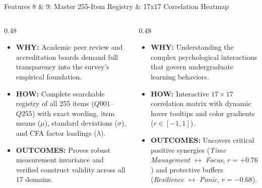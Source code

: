 \documentclass[aspectratio=169,10pt]{beamer}
\begin{document}
\begin{frame}{Features 8 \& 9: Master 255-Item Registry \& 17x17 Correlation Heatmap}
\begin{columns}[T]
\begin{column}{0.48\textwidth}
\begin{tcolorbox}[colframe=subhead,colbacktitle=subhead,colback=neutralbg,title=\textbf{Feature 8: Master 255-Question Psychometrics}]
\scriptsize
\begin{itemize}
    \item \textbf{WHY:} Academic peer review and accreditation boards demand full transparency into the survey's empirical foundation.
    \item \textbf{HOW:} Complete searchable registry of all 255 items ($Q001$--$Q255$) with exact wording, item means ($\mu$), standard deviations ($\sigma$), and CFA factor loadings ($\lambda$).
    \item \textbf{OUTCOMES:} Proves robust measurement invariance and verified construct validity across all 17 domains.
\end{itemize}
\end{tcolorbox}
\end{column}

\begin{column}{0.48\textwidth}
\begin{tcolorbox}[colframe=howframe,colbacktitle=howframe,colback=howbg,title=\textbf{Feature 9: 17x17 Pearson Correlation Heatmap}]
\scriptsize
\begin{itemize}
    \item \textbf{WHY:} Understanding the complex psychological interactions that govern undergraduate learning behaviors.
    \item \textbf{HOW:} Interactive $17 \times 17$ correlation matrix with dynamic hover tooltips and color gradients ($r \in [-1, 1]$).
    \item \textbf{OUTCOMES:} Uncovers critical positive synergies (\textit{Time Management} $\leftrightarrow$ \textit{Focus}, $r=+0.76$) and protective buffers (\textit{Resilience} $\leftrightarrow$ \textit{Panic}, $r=-0.68$).
\end{itemize}
\end{tcolorbox}
\end{column}
\end{columns}
\end{frame}
\end{document}
